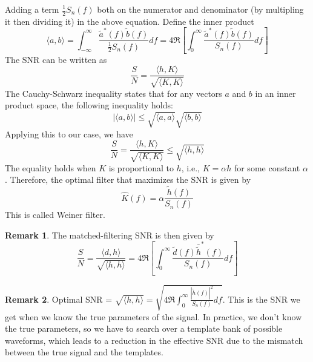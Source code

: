 \documentclass[12pt, a4paper]{article}
\newcounter{lecture}              %
\theoremstyle{plain} %
\theoremstyle{definition} %
\newtheorem{remark}{Remark}[lecture]
\begin{document}
Adding a term $\frac{1}{2}S_n(f)$ both on the numerator and denominator (by multipling it then dividing it) in the above equation.
Define the inner product
\begin{equation}
    \langle a, b \rangle =  \int_{-\infty}^{\infty} \frac{\tilde{a}^\ast(f) \tilde{b}(f)}{\frac{1}{2}S_n(f)} df  = 
    4 \Re \left[ \int_{0}^{\infty} \frac{\tilde{a}^\ast(f) \tilde{b}(f)}{S_n(f)} df \right]
\end{equation}
The SNR can be written as
\begin{equation}
    \frac{S}{N} = \frac{\langle h, K \rangle}{\sqrt{\langle K, K \rangle}}
\end{equation}
The Cauchy-Schwarz inequality states that for any vectors $a$ and $b$ in an inner product space, the following inequality holds:
\begin{equation}
    |\langle a, b \rangle| \leq \sqrt{\langle a, a \rangle} \sqrt{\langle b, b \rangle}
\end{equation}
Applying this to our case, we have
\begin{equation}
    \frac{S}{N} = \frac{\langle h, K \rangle}{\sqrt{\langle K, K \rangle}} \leq \sqrt{\langle h, h \rangle}
\end{equation}
The equality holds when $K$ is proportional to $h$, i.e., $K = \alpha h$ for some constant $\alpha$. Therefore, the optimal filter that maximizes the SNR is given by
\begin{equation}
    \hat{K}(f) = \alpha \frac{\tilde{h}(f)}{S_n(f)}
\end{equation}
This is called Weiner filter. 

\begin{remark}
    The matched-filtering SNR is then given by 
    \begin{equation}
        \frac{S}{N} = \frac{\langle d, h \rangle}{\sqrt{\langle h, h \rangle}} = 4 \Re \left[ \int_{0}^{\infty} \frac{\tilde{d}(f)\bar{\tilde{h}}^\ast(f)}{S_n(f)} df \right]
    \end{equation}
\end{remark}
\begin{remark}
    Optimal SNR = $\sqrt{\langle h, h \rangle} = \sqrt{4 \Re\int_0^\infty \frac{|\tilde{h}(f)|^2}{S_n(f)} df}$. This is the SNR we get when we know the true parameters of the signal. In practice, we don't know the true parameters, so we have to search over a template bank of possible waveforms, which leads to a reduction in the effective SNR due to the mismatch between the true signal and the templates.
\end{remark}
\end{document}
